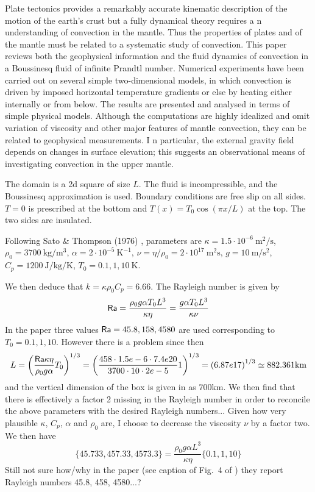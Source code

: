 \begin{center}
\begin{minipage}{13cm}
{\small 
Plate tectonics provides a remarkably accurate kinematic description of the
motion of the earth's crust but a fully dynamical theory requires a n understanding 
of convection in the mantle. Thus the properties of plates and of the
mantle must be related to a systematic study of convection. This paper reviews
both the geophysical information and the fluid dynamics of convection in a
Boussinesq fluid of infinite Prandtl number. Numerical experiments have been
carried out on several simple two-dimensional models, in which convection is
driven by imposed horizontal temperature gradients or else by heating either
internally or from below. The results are presented and analysed in terms of
simple physical models. Although the computations are highly idealized and
omit variation of viscosity and other major features of mantle convection, they
can be related to geophysical measurements. I n particular, the external gravity
field depends on changes in surface elevation; this suggests an observational
means of investigating convection in the upper mantle.}
\end{minipage}
\end{center}

The domain is a 2d square of size $L$. The fluid is incompressible, and the Boussinesq 
approximation is used. Boundary conditions are free slip on all sides. $T=0$ is prescribed 
at the bottom and $T(x)=T_0 \cos (\pi x/L)$ at the top. The two sides are insulated.

Following Sato \& Thompson (1976) \cite{sath76}, 
parameters are $\kappa=1.5\cdot 10^{-6}~\si{\square\m\per\second}$, 
$\rho_0=3700~\si{\kg\per\cubic\metre}$, $\alpha=2\cdot 10^{-5}~\si{\kelvin}^{-1}$, 
$\nu=\eta/\rho_0=2\cdot10^{17}~\si{\square\metre\second}$, $g=10~\si{\metre\per\square\second}$, 
$C_p=1200~\si{\joule\per\kg\per\kelvin}$, $T_0=0.1,1,10~\si{\kelvin}$.  

We then deduce that $k=\kappa \rho_0 C_p = 6.66$. The Rayleigh number is given by
\[
{\mathsf{Ra}} 
= \frac{ \rho_0 g \alpha T_0 L^3  }{\kappa \eta}
= \frac{  g \alpha T_0 L^3  }{\kappa \nu}
\]
In the paper three values ${\mathsf{Ra}}=45.8,158,4580$ are used  corresponding to $T_0=0.1,1,10$. 
However there is a problem since then 
\[
L = \left( \frac{{\mathsf{Ra}} \kappa \eta}{\rho_0 g \alpha } T_0   \right)^{1/3}
= \left( \frac{458\cdot 1.5e-6\cdot 7.4e20}{3700\cdot 10\cdot 2e-5 } 1   \right)^{1/3}
= \left( 6.87e17 \right)^{1/3}
\simeq 882.361 \si{\kilo\metre}
\]
and the vertical dimension of the box is given in \cite{mcrw74} as 700\si{\km}. 
We then find that there is effectively a factor 2 missing in the Rayleigh number in order
to reconcile the above parameters with the desired Rayleigh numbers... 
Given how very plausible $\kappa$, $C_p$, $\alpha$ and $\rho_0$ are, I choose to 
decrease the viscosity $\nu$ by a factor two.
We then have 
\[
\{ 45.733, 457.33, 4573.3 \} = \frac{ \rho_0 g \alpha  L^3  }{\kappa \eta} \{ 0.1, 1, 10\}
\]
Still not sure how/why in the paper (see caption of Fig.~4 of \cite{mcrw74}) 
they report Rayleigh numbers 45.8, 458, 4580...?

